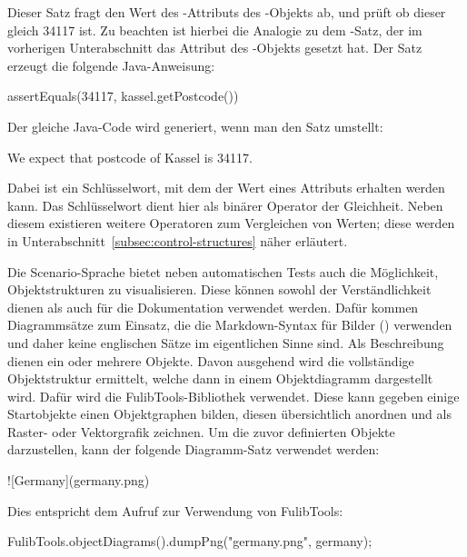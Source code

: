 Dieser Satz fragt den Wert des -Attributs des -Objekts ab, und prüft ob dieser gleich 34117 ist.
Zu beachten ist hierbei die Analogie zu dem -Satz, der im vorherigen Unterabschnitt das Attribut des -Objekts gesetzt hat.
Der Satz erzeugt die folgende Java-Anweisung:

\begin{jcodeblock}
    assertEquals(34117, kassel.getPostcode())
\end{jcodeblock}

Der gleiche Java-Code wird generiert, wenn man den Satz umstellt:

\begin{codeblock}
    We expect that postcode of Kassel is 34117.
\end{codeblock}

Dabei ist  ein Schlüsselwort, mit dem der Wert eines Attributs erhalten werden kann.
Das Schlüsselwort  dient hier als binärer Operator der Gleichheit.
Neben diesem existieren weitere Operatoren zum Vergleichen von Werten;
diese werden in Unterabschnitt~\ref{subsec:control-structures} näher erläutert.

Die Scenario-Sprache bietet neben automatischen Tests auch die Möglichkeit, Objektstrukturen zu visualisieren.
Diese können sowohl der Verständlichkeit dienen als auch für die Dokumentation verwendet werden.
Dafür kommen Diagrammsätze zum Einsatz, die die Markdown-Syntax für Bilder () verwenden und daher keine englischen Sätze im eigentlichen Sinne sind.
Als Beschreibung dienen ein oder mehrere Objekte.
Davon ausgehend wird die vollständige Objektstruktur ermittelt, welche dann in einem Objektdiagramm dargestellt wird.
Dafür wird die FulibTools\cite{fulibTools}-Bibliothek verwendet.
Diese kann gegeben einige Startobjekte einen Objektgraphen bilden, diesen übersichtlich anordnen und als Raster- oder Vektorgrafik zeichnen.
Um die zuvor definierten Objekte darzustellen, kann der folgende Diagramm-Satz verwendet werden:

\begin{mdcodeblock}
    ![Germany](germany.png)
\end{mdcodeblock}

Dies entspricht dem Aufruf zur Verwendung von FulibTools:

\begin{jcodeblock}
    FulibTools.objectDiagrams().dumpPng("germany.png", germany);
\end{jcodeblock}

